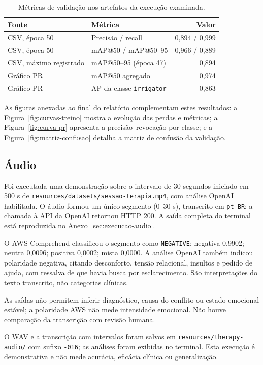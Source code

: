 \documentclass[12pt,a4paper]{article}
\begin{document}
\begin{table}[ht]
\centering
\caption{Métricas de validação nos artefatos da execução examinada.}
\begin{tabular}{llr}
\toprule
\textbf{Fonte} & \textbf{Métrica} & \textbf{Valor} \\
\midrule
CSV, época 50 & Precisão / recall & 0,894 / 0,999 \\
CSV, época 50 & mAP@50 / mAP@50--95 & 0,966 / 0,889 \\
CSV, máximo registrado & mAP@50--95 (época 47) & 0,894 \\
Gráfico PR & mAP@50 agregado & 0,974 \\
Gráfico PR & AP da classe \texttt{irrigator} & 0,863 \\
\bottomrule
\end{tabular}
\end{table}

As figuras anexadas ao final do relatório complementam estes resultados: a Figura~\ref{fig:curvas-treino} mostra a evolução das perdas e métricas; a Figura~\ref{fig:curva-pr} apresenta a precisão--revocação por classe; e a Figura~\ref{fig:matriz-confusao} detalha a matriz de confusão da validação.

\subsection{Áudio}

Foi executada uma demonstração sobre o intervalo de 30 segundos iniciado em 500 s de \texttt{resources/datasets/sessao-terapia.mp4}, com análise OpenAI habilitada. O áudio formou um único segmento (0--30 s), transcrito em \texttt{pt-BR}; a chamada à API da OpenAI retornou HTTP 200. A saída completa do terminal está reproduzida no Anexo~\ref{sec:execucao-audio}.

O AWS Comprehend classificou o segmento como \texttt{NEGATIVE}: negativa 0,9902; neutra 0,0096; positiva 0,0002; mista 0,0000. A análise OpenAI também indicou polaridade negativa, citando desconforto, tensão relacional, insultos e pedido de ajuda, com ressalva de que havia busca por esclarecimento. São interpretações do texto transcrito, não categorias clínicas.

As saídas não permitem inferir diagnóstico, causa do conflito ou estado emocional estável; a polaridade AWS não mede intensidade emocional. Não houve comparação da transcrição com revisão humana.

O WAV e a transcrição com intervalos foram salvos em \texttt{resources/therapy-audio/} com sufixo \texttt{-016}; as análises foram exibidas no terminal. Esta execução é demonstrativa e não mede acurácia, eficácia clínica ou generalização.
\end{document}

